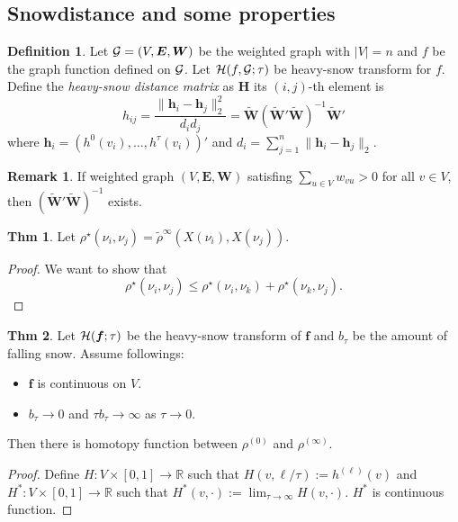 \documentclass[preprint, review, 12pt]{article}
\theoremstyle{definition}
\newtheorem{dfn}{Definition}
\newtheorem{thm}{Thm}[section]
\newtheorem{rmk}{Remark}[section]
\theoremstyle{remark}
\begin{document}
\subsection{Snowdistance and some properties} 
\begin{dfn}
Let ${\cal G}=(V,{\boldsymbol E},{\boldsymbol W})$ be the weighted graph with $|V|=n$ and $f$ be the graph function defined on ${\cal G}$. Let ${\cal H}(f,{\cal G};\tau)$ be heavy-snow transform for $f$. Define the \emph{heavy-snow distance matrix} as ${\boldsymbol H}$ its $(i,j)$-th element is 
\[
h_{ij}= \frac{\|{\boldsymbol h}_i- {\boldsymbol h}_j\|_2^2 }{d_id_j}=\widetilde{\boldsymbol W}(\widetilde{\boldsymbol W}'\widetilde{\boldsymbol W})^{-1}\widetilde{\boldsymbol W}'
\]
where ${\boldsymbol h}_i=(h^{0}(v_i),\dots,h^{\tau}(v_i))'$ and $d_i=\sum_{j=1}^{n}\|{\boldsymbol h}_i- {\boldsymbol h}_j\|_2$. 
\end{dfn}

\begin{rmk} If weighted graph $(V,{\boldsymbol E},{\boldsymbol W})$ satisfing 
$\sum_{u \in V}w_{vu}>0 $
for all $v \in V$, then $(\widetilde{\boldsymbol W}'\widetilde{\boldsymbol W})^{-1}$ exists. 

\end{rmk}


\begin{thm} 
Let $\rho^{\star}(\nu_i,\nu_j)=\tilde \rho^{\infty}(X(\nu_i),X(\nu_j)).$ 
\end{thm}
\begin{proof}
We want to show that 
\[
\rho^{\star}(\nu_i,\nu_j)\leq \rho^{\star}(\nu_i,\nu_k)+\rho^{\star}(\nu_k,\nu_j).
\]
\end{proof}

\begin{thm}
Let ${\cal H}({\boldsymbol f};\tau)$ be the heavy-snow transform of ${\boldsymbol f}$ and $b_{\tau}$ be the amount of falling snow. Assume followings:
\begin{itemize}
	\item ${\boldsymbol f}$ is continuous on $V$. 
	\item $b_{\tau} \to 0$ and $\tau b_\tau \to \infty$ as $\tau \to 0$.
\end{itemize}
Then there is homotopy function between $\rho^{(0)}$ and $\rho^{(\infty)}$. 
\end{thm}
\begin{proof}
Define $H:V \times [0,1] \to \mathbb{R}$ such that $H(v,\ell/\tau):=h^{(\ell)}(v)$ and $H^*:V \times [0,1] \to \mathbb{R}$ such that $H^*(v,\cdot):=\lim_{\tau \to \infty} H(v,\cdot)$. $H^*$ is continuous function. 
\end{proof}
\end{document}
